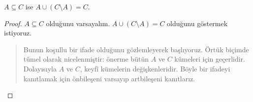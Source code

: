 \documentclass[../../../include/open-logic-section]{subfiles}
\begin{document}


\begin{prop}
$A \subseteq C$ ise $A \cup (C \setminus A) = C$.
\end{prop}

\begin{proof}
  $A \subseteq C$ olduğunu varsayalım. $A \cup (C \setminus A) = C$
  olduğunu göstermek istiyoruz.
  \begin{quote}
    Bunun koşullu bir ifade olduğunu gözlemleyerek başlıyoruz. Örtük
    biçimde tümel olarak nicelenmiştir: önerme bütün $A$ ve $C$ kümeleri
    için geçerlidir. Dolayısıyla $A$ ve $C$, keyfî kümelerin
    değişkenleridir. Böyle bir ifadeyi kanıtlamak için önbileşeni
    varsayıp artbileşeni kanıtlarız.


\end{quote}
\end{proof}
\end{document}
